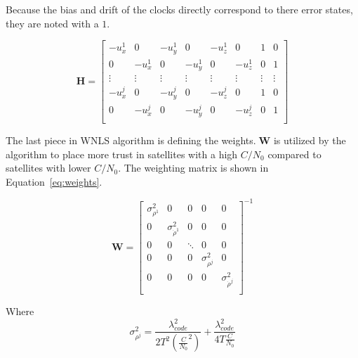 Because the bias and drift of the clocks directly correspond to there error states, they are noted with a \(1\).

\begin{equation}\label{eq:Hmat}
    \mathbf{H} =
    \begin{bmatrix}
        -u_x^1 & 0      & -u_y^1 & 0      & -u_z^1 & 0      & 1      & 0      \\
        0      & -u_x^1 & 0      & -u_y^1 & 0      & -u_z^1 & 0      & 1      \\
        \vdots & \vdots & \vdots & \vdots & \vdots & \vdots & \vdots & \vdots \\
        -u_x^j & 0      & -u_y^j & 0      & -u_z^j & 0      & 1      & 0      \\
        0      & -u_x^j & 0      & -u_y^j & 0      & -u_z^j & 0      & 1      \\
    \end{bmatrix}
\end{equation}

The last piece in WNLS algorithm is defining the weights.\( \; \mathbf{W}\) is utilized by the algorithm to place more trust in satellites with a high \(C/N_0\) compared to satellites with lower \(C/N_0\). The weighting matrix is shown in Equation~\ref{eq:weights}.

\begin{equation}\label{eq:weights}
    \mathbf{W} = \begin{bmatrix}
        \sigma^2_{\rho^1} & 0                       & 0      & 0                 & 0                       \\
        0                 & \sigma^2_{\dot{\rho}^1} & 0      & 0                 & 0                       \\
        0                 & 0                       & \ddots & 0                 & 0                       \\
        0                 & 0                       & 0      & \sigma^2_{\rho^j} & 0                       \\
        0                 & 0                       & 0      & 0                 & \sigma^2_{\dot{\rho}^j} \\
    \end{bmatrix}^{-1}
\end{equation}

Where
\begin{equation}\label{eq:psrVar}
    \sigma^2_{\rho^j} = \frac{\lambda^2_{code}}{2T^2{\left(\frac{C}{N_0}^2\right)}} + \frac{\lambda^2_{code}}{4T\frac{C}{N_0}}
\end{equation}

